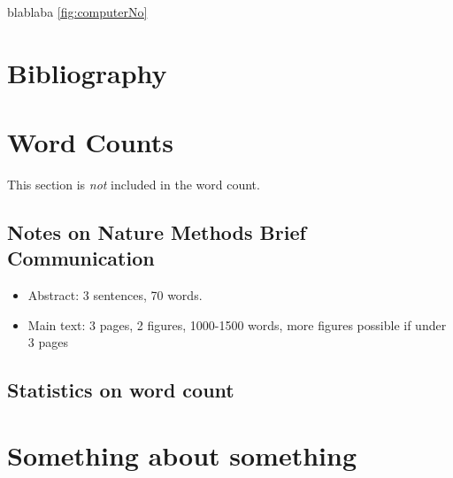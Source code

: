 \documentclass[times, twoside, watermark]{zHenriquesLab-StyleBioRxiv}
\begin{document}
blablaba \ref{fig:computerNo} 
\blindtext

\section*{Bibliography}


\onecolumn
\newpage

\section*{Word Counts}
This section is \textit{not} included in the word count. 
\subsection*{Notes on Nature Methods Brief Communication}
\begin{itemize}
\item Abstract: 3 sentences, 70 words.
\item Main text: 3 pages, 2 figures, 1000-1500 words, more figures possible if under 3 pages
\end{itemize}

\subsection*{Statistics on word count}
\detailtexcount
\newpage

\captionsetup*{format=largeformat}
\section{Something about something} \label{note:Note1} 
\Blindtext

\end{document}
